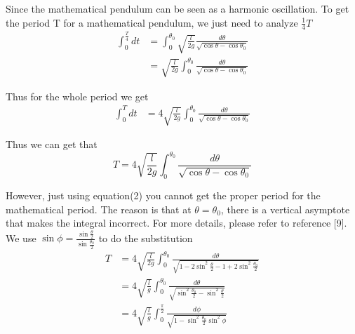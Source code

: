 \documentclass{article}
\begin{document}
\par Since the mathematical pendulum can be seen as a harmonic oscillation. To get the period T for a mathematical pendulum, we just need to analyze $\frac{1}{4}T $
\begin{equation*}
 \begin{aligned}
 \int_0^{\frac{T}{4}} dt & = \int_0^{\theta_0} \sqrt{\frac{l}{2g}} \frac{d \theta} {\sqrt{\cos\theta - \cos \theta_0}} \\
                                       & =\sqrt{\frac{l}{2g}} \int_0^{\theta_0} \frac{d \theta} {\sqrt{\cos\theta - \cos \theta_0}} 
 \end{aligned}
\end{equation*}
	\par Thus for the whole period we get 
\begin{equation*}
 \begin{aligned}
 \int_0^{T} dt & = 4\sqrt{\frac{l}{2g}} \int_0^{\theta_0}\frac{d \theta} {\sqrt{\cos\theta - \cos \theta_0}} 
 \end{aligned}
\end{equation*}
	\par Thus we can get that 
\begin{equation}
 T = 4\sqrt{\frac{l}{2g}} \int_0^{\theta_0}\frac{d \theta} {\sqrt{\cos\theta - \cos \theta_0}} 
\end{equation}
\par However, just using equation(2)  you cannot get the proper period for the mathematical period. The reason is that at $\theta = \theta_0$, there is a vertical asymptote that makes the integral incorrect. For more details, please refer to reference [9]. \\
We use $ \sin \phi = \frac{ \sin \frac{\theta}{2}}{ \sin \frac{\theta_0}{2} } $ to do the substitution
\begin{equation*}
 \begin{aligned}
 T & = 4\sqrt{\frac{l}{2g}} \int_0^{\theta_0}\frac{d \theta} {\sqrt{1- 2 \sin^2 \frac{\theta}{2} -1 +2 \sin^2 \frac{\theta_0}{2}}}\\
    & =  4\sqrt{\frac{l}{g}} \int_0^{\theta_0}\frac{d \theta} {\sqrt{\sin^2 \frac{\theta_0}{2} - \sin^2 \frac{\theta}{2}}}\\
    & = 4\sqrt{\frac{l}{g}} \int_0^{\frac{\pi}{2}} \frac{d \phi}{\sqrt{1 - \sin^2 \frac{\theta_0}{2} \sin^2 \phi}}
 \end{aligned}
\end{equation*}
\end{document}
